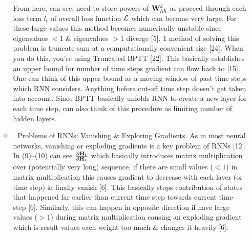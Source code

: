\documentclass{article}
\begin{document}
\begin{enumerate}
\begin{itemize}
		From here, can see: need to store powers of ${\bf W}_{hh}^k$ as proceed through each loss term $l_t$ of overall loss function ${\cal L}$ which can become very large. For these large values this method becomes numerically unstable since eigenvalues $< 1$ \& eigenvalues $> 1$ diverge [5]. 1 method of solving this problem is truncate sum at a computationally convenient size [24]. When you do this, you're using Truncated BPTT [22]. This basically establishes an upper bound for number of time steps gradient can flow back to [15]. One can think of this upper bound as a moving window of past time steps which RNN considers. Anything before cut-off time step doesn't get taken into account. Since BPTT basically unfolds RNN to create a new layer for each time step, can also think of this procedure as limiting number of hidden layers.
		\item {. Problems of RNNs: Vanishing \& Exploring Gradients.} As in most neural networks, vanishing or exploding gradients is a key problem of RNNs [12]. In (9)--(10) can see $\frac{\partial{\bf H}_t}{\partial{\bf H}_k}$ which basically introduces matrix multiplication over (potentially very long) sequence, if there are small values ($< 1$) in matrix multiplication this causes gradient to decrease with each layer (or time step) \& finally vanish [6]. This basically stops contribution of states that happened far earlier than current time step towards current time step [6]. Similarly, this can happen in opposite direction if have large values ($> 1$) during matrix multiplication causing an exploding gradient which is result values each weight too much \& changes it heavily [6].
		

\end{itemize}
\end{enumerate}
\end{document}

